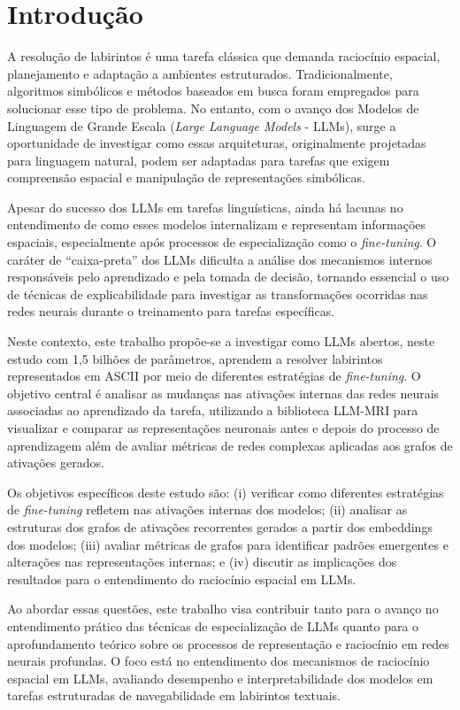 \section{Introdução}\label{sec:introducao}

A resolução de labirintos é uma tarefa clássica que demanda raciocínio espacial, planejamento e adaptação a ambientes estruturados. Tradicionalmente, algoritmos simbólicos e métodos baseados em busca foram empregados para solucionar esse tipo de problema. No entanto, com o avanço dos Modelos de Linguagem de Grande Escala (\textit{Large Language Models} - LLMs), surge a oportunidade de investigar como essas arquiteturas, originalmente projetadas para linguagem natural, podem ser adaptadas para tarefas que exigem compreensão espacial e manipulação de representações simbólicas.

Apesar do sucesso dos LLMs em tarefas linguísticas, ainda há lacunas no entendimento de como esses modelos internalizam e representam informações espaciais, especialmente após processos de especialização como o \textit{fine-tuning}. O caráter de ``caixa-preta'' dos LLMs dificulta a análise dos mecanismos internos responsáveis pelo aprendizado e pela tomada de decisão, tornando essencial o uso de técnicas de explicabilidade para investigar as transformações ocorridas nas redes neurais durante o treinamento para tarefas específicas.

Neste contexto, este trabalho propõe-se a investigar como LLMs abertos, neste estudo com 1,5 bilhões de parâmetros, aprendem a resolver labirintos representados em ASCII por meio de diferentes estratégias de \textit{fine-tuning}. O objetivo central é analisar as mudanças nas ativações internas das redes neurais associadas ao aprendizado da tarefa, utilizando a biblioteca LLM-MRI \cite{costa2024llmmri} para visualizar e comparar as representações neuronais antes e depois do processo de aprendizagem além de avaliar métricas de redes complexas aplicadas aos grafos de ativações gerados.

Os objetivos específicos deste estudo são: (i) verificar como diferentes estratégias de \textit{fine-tuning} refletem nas ativações internas dos modelos; (ii) analisar as estruturas dos grafos de ativações recorrentes gerados a partir dos embeddings dos modelos; (iii) avaliar métricas de grafos para identificar padrões emergentes e alterações nas representações internas; e (iv) discutir as implicações dos resultados para o entendimento do raciocínio espacial em LLMs.

Ao abordar essas questões, este trabalho visa contribuir tanto para o avanço no entendimento prático das técnicas de especialização de LLMs quanto para o aprofundamento teórico sobre os processos de representação e raciocínio em redes neurais profundas. O foco está no entendimento dos mecanismos de raciocínio espacial em LLMs, avaliando desempenho e interpretabilidade dos modelos em tarefas estruturadas de navegabilidade em labirintos textuais.


